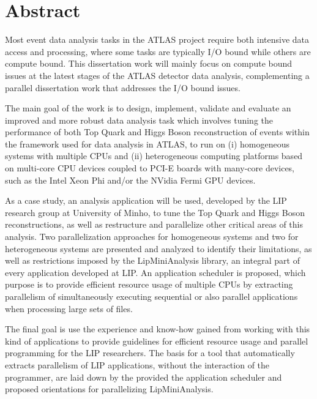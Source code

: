\chapter*{Abstract}
\label{Abstract}

Most event data analysis tasks in the ATLAS project require both intensive data access and processing, where some tasks are typically I/O bound while others are compute bound. This dissertation work will mainly focus on compute bound issues at the latest stages of the ATLAS detector data analysis, complementing a parallel dissertation work that addresses the I/O bound issues.

The main goal of the work is to design, implement, validate and evaluate an improved and more robust data analysis task which involves tuning the performance of both Top Quark and Higgs Boson reconstruction of events within the framework used for data analysis in ATLAS, to run on (i) homogeneous systems with multiple CPUs and (ii) heterogeneous computing platforms based on multi-core CPU devices coupled to PCI-E boards with many-core devices, such as the Intel Xeon Phi and/or the NVidia Fermi GPU devices.

As a case study, an analysis application will be used, developed by the LIP research group at University of Minho, to tune the Top Quark and Higgs Boson reconstructions, as well as restructure and parallelize other critical areas of this analysis. Two parallelization approaches for homogeneous systems and two for heterogeneous systems are presented and analyzed to identify their limitations, as well as restrictions imposed by the LipMiniAnalysis library, an integral part of every application developed at LIP. An application scheduler is proposed, which purpose is to provide efficient resource usage of multiple CPUs by extracting parallelism of simultaneously executing sequential or also parallel applications when processing large sets of files.

The final goal is use the experience and know-how gained from working with this kind of applications to provide guidelines for efficient resource usage and parallel programming for the LIP researchers. The basis for a tool that automatically extracts parallelism of LIP applications, without the interaction of the programmer, are laid down by the provided the application scheduler and proposed orientations for parallelizing LipMiniAnalysis.